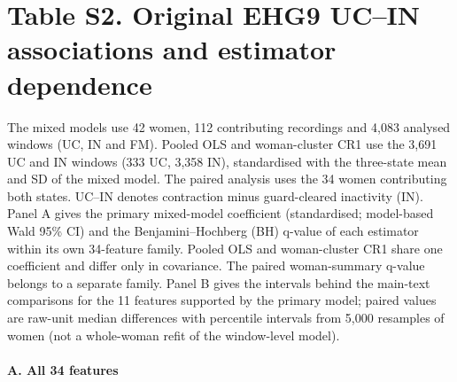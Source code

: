 \documentclass[10pt]{article}
\begin{document}
\section*{Table S2. Original EHG9 UC--IN associations and estimator dependence}\label{tab:s2_model_dependence}
The mixed models use 42 women, 112 contributing recordings and 4,083 analysed windows (UC, IN and FM). Pooled OLS and woman-cluster CR1 use the 3,691 UC and IN windows (333 UC, 3,358 IN), standardised with the three-state mean and SD of the mixed model. The paired analysis uses the 34 women contributing both states. UC--IN denotes contraction minus guard-cleared inactivity (IN). Panel A gives the primary mixed-model coefficient (standardised; model-based Wald 95\% CI) and the Benjamini--Hochberg (BH) q-value of each estimator within its own 34-feature family. Pooled OLS and woman-cluster CR1 share one coefficient and differ only in covariance. The paired woman-summary q-value belongs to a separate family. Panel B gives the intervals behind the main-text comparisons for the 11 features supported by the primary model; paired values are raw-unit median differences with percentile intervals from 5,000 resamples of women (not a whole-woman refit of the window-level model).
\paragraph{A. All 34 features}
\end{document}
